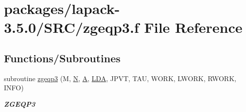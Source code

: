 \hypertarget{zgeqp3_8f}{}\section{packages/lapack-\/3.5.0/\+S\+R\+C/zgeqp3.f File Reference}
\label{zgeqp3_8f}
\subsection*{Functions/\+Subroutines}
\begin{DoxyCompactItemize}
\item 
subroutine \hyperlink{group__complex16GEcomputational_ga2b95c0e9330d8b3f0d9468d99c28d36e}{zgeqp3} (M, \hyperlink{polmisc_8c_a0240ac851181b84ac374872dc5434ee4}{N}, \hyperlink{classA}{A}, \hyperlink{example__user_8c_ae946da542ce0db94dced19b2ecefd1aa}{L\+D\+A}, J\+P\+V\+T, T\+A\+U, W\+O\+R\+K, L\+W\+O\+R\+K, R\+W\+O\+R\+K, I\+N\+F\+O)
\begin{DoxyCompactList}\small\item\em {\bfseries Z\+G\+E\+Q\+P3} \end{DoxyCompactList}\end{DoxyCompactItemize}
